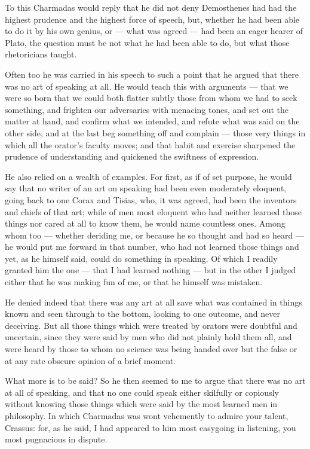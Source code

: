  To this Charmadas would reply that he did not deny Demosthenes had had the highest prudence and the highest force of speech, but, whether he had been able to do it by his own genius, or — what was agreed — had been an eager hearer of Plato, the question must be not what he had been able to do, but what those rhetoricians taught.

 Often too he was carried in his speech to such a point that he argued that there was no art of speaking at all. He would teach this with arguments — that we were so born that we could both flatter subtly those from whom we had to seek something, and frighten our adversaries with menacing tones, and set out the matter at hand, and confirm what we intended, and refute what was said on the other side, and at the last beg something off and complain — those very things in which all the orator's faculty moves; and that habit and exercise sharpened the prudence of understanding and quickened the swiftness of expression.

 He also relied on a wealth of examples. For first, as if of set purpose, he would say that no writer of an art on speaking had been even moderately eloquent, going back to one Corax and Tisias, who, it was agreed, had been the inventors and chiefs of that art; while of men most eloquent who had neither learned those things nor cared at all to know them, he would name countless ones. Among whom too — whether deriding me, or because he so thought and had so heard — he would put me forward in that number, who had not learned those things and yet, as he himself said, could do something in speaking. Of which I readily granted him the one — that I had learned nothing — but in the other I judged either that he was making fun of me, or that he himself was mistaken.

 He denied indeed that there was any art at all save what was contained in things known and seen through to the bottom, looking to one outcome, and never deceiving. But all those things which were treated by orators were doubtful and uncertain, since they were said by men who did not plainly hold them all, and were heard by those to whom no science was being handed over but the false or at any rate obscure opinion of a brief moment.

 What more is to be said? So he then seemed to me to argue that there was no art at all of speaking, and that no one could speak either skilfully or copiously without knowing those things which were said by the most learned men in philosophy. In which Charmadas was wont vehemently to admire your talent, Crassus: for, as he said, I had appeared to him most easygoing in listening, you most pugnacious in dispute.

